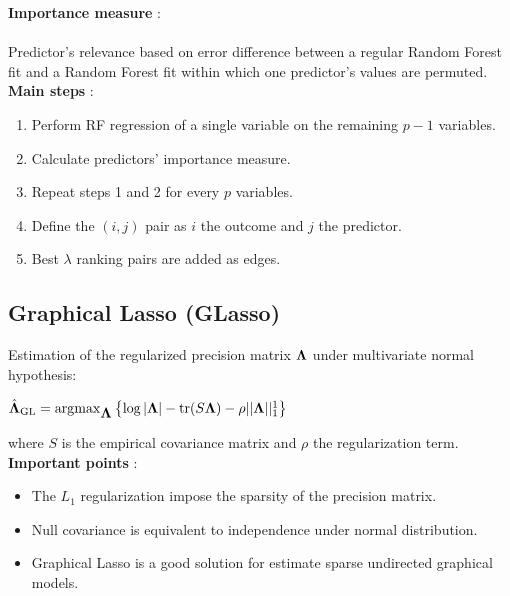 \documentclass[landscape,a0paper,fontscale=0.285]{baposter} %
\newcommand{\compresslist}{ %
\setlength{\itemsep}{1pt}
\setlength{\parskip}{0pt}
\setlength{\parsep}{0pt}
}
\newcommand{\bfLambda}{\mbox{\boldmath$\Lambda$}}
\DeclareMathOperator*{\argmax}{\arg\!\max}
\begin{document}
\begin{poster}
{\textbf{Importance measure} :\\  \\
Predictor's relevance based on error difference between a regular Random Forest fit and a Random Forest fit within which one predictor's values are permuted.\\

\textbf{Main steps} : 
\begin{enumerate}\compresslist
\item Perform RF regression of a single variable on the remaining $p-1$ variables.
\item Calculate predictors' importance measure.
\item Repeat steps 1 and 2 for every $p$ variables.
\item Define the $(i,j) $ pair as $i$ the outcome and $j$ the predictor.
\item Best $\lambda$ ranking pairs are added as edges.
\end{enumerate}


\vspace{0 cm}
\subsection*{Graphical Lasso (GLasso)}

Estimation of the regularized precision matrix $\bfLambda$  under multivariate normal hypothesis:

\begin{center}
	$\hat{\bfLambda}_{\text{GL}} = \argmax_{\bfLambda} \left\{ \log |\bfLambda| - \text{tr}(S \bfLambda) - \rho || \bfLambda||_{1}^{1} \right\} \ $
\end{center}
where $S$ is the empirical covariance matrix and $\rho$  the regularization term. \\

\textbf{Important points} : 


\begin{itemize}\compresslist
	\item The $L_{1}$ regularization impose the sparsity of the precision matrix.
	\item Null covariance is equivalent to independence under normal distribution.
	\item Graphical Lasso is a good solution for estimate sparse undirected graphical models.
\end{itemize}



\vspace{0em} %
}



\end{poster}
\end{document}
